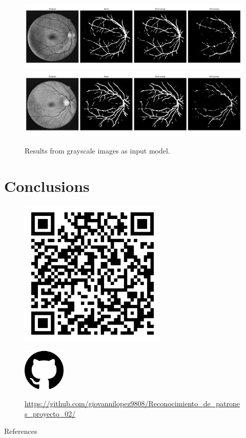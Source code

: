 \begin{frame}
  \begin{figure}[H]
    \includegraphics[width=13cm]{Graphics/grayscale/04.png}
    \includegraphics[width=13cm]{Graphics/grayscale/14.png}
    \caption{Results from grayscale images as input model.}
  \end{figure}
\end{frame}

\section{Conclusions}

\begin{frame}
  \vspace{1cm}
  \begin{minipage}{7cm}
    \begin{figure}[H]
      \includegraphics[width=7cm]{Graphics/qr-code.png}
    \end{figure}
  \end{minipage}
  \begin{minipage}{7cm}
    \begin{figure}[H]
      \includegraphics[width=2cm]{Graphics/github.png}\\
      \caption*{\url{https://github.com/giovannilopez9808/Reconocimiento_de_patrones_proyecto_02/}}
    \end{figure}
  \end{minipage}
\end{frame}

\begin{frame}[allowframebreaks]{References}
  
  \nocite{*}
  
\end{frame}
